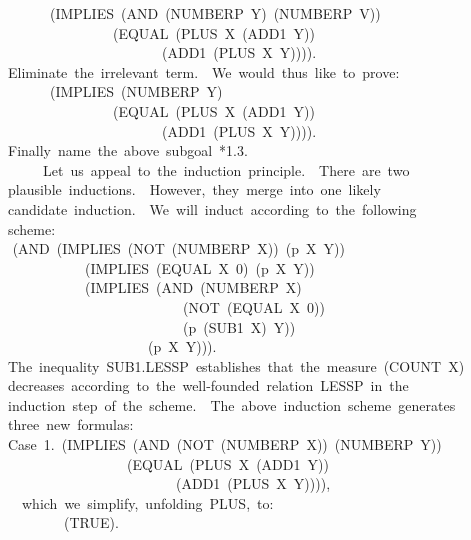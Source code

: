 \documentclass[10pt]{book}
\newenvironment{pubasis}{\begin{flushleft}}{\end{flushleft}}
\begin{document}
\begin{pubasis}
~~~~~~~~(IMPLIES~(AND~(NUMBERP~Y)~(NUMBERP~V))\\
~~~~~~~~~~~~~~~~~(EQUAL~(PLUS~X~(ADD1~Y))\\
~~~~~~~~~~~~~~~~~~~~~~~~(ADD1~(PLUS~X~Y)))).\\

~~Eliminate~the~irrelevant~term.~~We~would~thus~like~to~prove:\\

~~~~~~~~(IMPLIES~(NUMBERP~Y)\\
~~~~~~~~~~~~~~~~~(EQUAL~(PLUS~X~(ADD1~Y))\\
~~~~~~~~~~~~~~~~~~~~~~~~(ADD1~(PLUS~X~Y)))).\\

~~Finally~name~the~above~subgoal~*1.3.\\

~~~~~~~Let~us~appeal~to~the~induction~principle.~~There~are~two\\
~~plausible~inductions.~~However,~they~merge~into~one~likely\\
~~candidate~induction.~~We~will~induct~according~to~the~following\\
~~scheme:\\
~~	(AND~(IMPLIES~(NOT~(NUMBERP~X))~(p~X~Y))\\
~~~~~~~~~~~~~(IMPLIES~(EQUAL~X~0)~(p~X~Y))\\
~~~~~~~~~~~~~(IMPLIES~(AND~(NUMBERP~X)\\
~~~~~~~~~~~~~~~~~~~~~~~~~~~(NOT~(EQUAL~X~0))\\
~~~~~~~~~~~~~~~~~~~~~~~~~~~(p~(SUB1~X)~Y))\\
~~~~~~~~~~~~~~~~~~~~~~(p~X~Y))).\\
~~The~inequality~SUB1.LESSP~establishes~that~the~measure~(COUNT~X)\\
~~decreases~according~to~the~well-founded~relation~LESSP~in~the\\
~~induction~step~of~the~scheme.~~The~above~induction~scheme~generates\\
~~three~new~formulas:\\

~~Case~1.~(IMPLIES~(AND~(NOT~(NUMBERP~X))~(NUMBERP~Y))\\
~~~~~~~~~~~~~~~~~~~(EQUAL~(PLUS~X~(ADD1~Y))\\
~~~~~~~~~~~~~~~~~~~~~~~~~~(ADD1~(PLUS~X~Y)))),\\

~~~~which~we~simplify,~unfolding~PLUS,~to:\\

~~~~~~~~~~(TRUE).\\


\end{pubasis}
\end{document}
